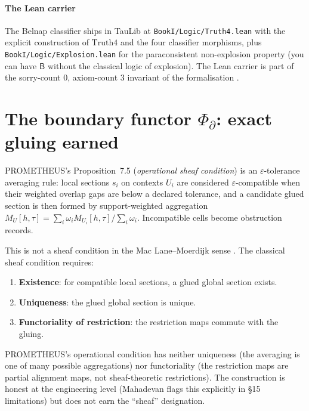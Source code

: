 \documentclass{pantarhei-researchnote}
\newcommand{\Truth}{\ensuremath{\mathrm{Truth4}}}
\begin{document}
\paragraph{The Lean carrier}
The Belnap classifier ships in TauLib \cite{TauLib2026} at
\texttt{BookI/Logic/Truth4.lean} with the explicit construction of
$\Truth$ and the four classifier morphisms, plus
\texttt{BookI/Logic/Explosion.lean} for the paraconsistent
non-explosion property (you can have $\mathsf{B}$ without the
classical logic of explosion). The Lean carrier is part of the
sorry-count $0$, axiom-count $3$ invariant of the formalisation
\cite{TauLib2026}.

\section{\texorpdfstring{The boundary functor $\Phi_{\partial}$: exact gluing earned}{The boundary functor Phi-boundary: exact gluing earned}}
\label{sec:phi-d}

PROMETHEUS's Proposition~7.5 (\emph{operational sheaf condition}) is
an $\varepsilon$-tolerance averaging rule: local sections $s_{i}$ on
contexts $U_{i}$ are considered $\varepsilon$-compatible when their
weighted overlap gaps are below a declared tolerance, and a candidate
glued section is then formed by support-weighted aggregation
$M_{U}[h, \tau] = \sum_{i} \omega_{i} M_{U_{i}}[h, \tau] / \sum_{i}
\omega_{i}$. Incompatible cells become obstruction records.

This is not a sheaf condition in the Mac Lane--Moerdijk sense
\cite{MacLane-Moerdijk-1992}. The classical sheaf condition requires:

\begin{enumerate}
\item \textbf{Existence}: for compatible local sections, a glued
global section exists.
\item \textbf{Uniqueness}: the glued global section is unique.
\item \textbf{Functoriality of restriction}: the restriction maps
commute with the gluing.
\end{enumerate}

PROMETHEUS's operational condition has neither uniqueness (the
averaging is one of many possible aggregations) nor functoriality
(the restriction maps are partial alignment maps, not
sheaf-theoretic restrictions). The construction is honest at the
engineering level (Mahadevan flags this explicitly in §15
limitations) but does not earn the ``sheaf'' designation.
\end{document}
